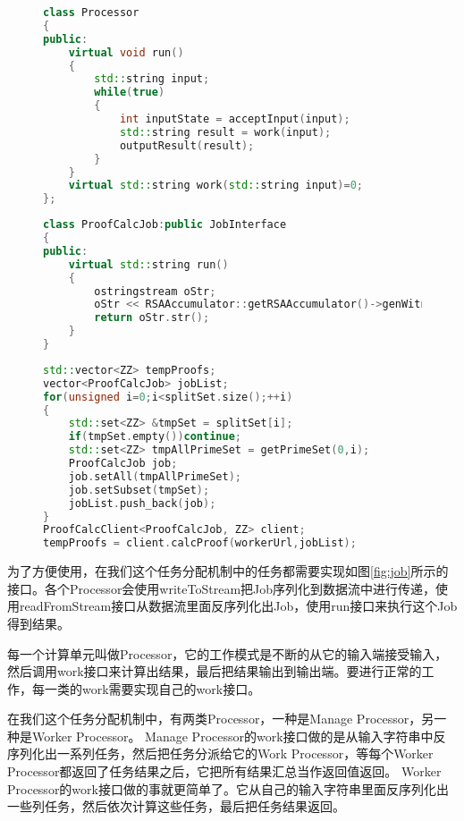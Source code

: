 \begin{figure}[htb]
\begin{lstlisting}[language=C++] 
class Processor
{
public:
    virtual void run()
    {
        std::string input;
        while(true)
        {
            int inputState = acceptInput(input);
            std::string result = work(input);
            outputResult(result);
        }
    }
    virtual std::string work(std::string input)=0;
};
\end{lstlisting}
\end{figure}
\begin{figure}[htb]
\begin{lstlisting}[language=C++] 
class ProofCalcJob:public JobInterface
{
public:
    virtual std::string run()
    {
        ostringstream oStr;
        oStr << RSAAccumulator::getRSAAccumulator()->genWitness(allSet, subset);
        return oStr.str();
    }
}
\end{lstlisting}
\end{figure}

\begin{figure}[htb]
\begin{lstlisting}[language=C++] 
std::vector<ZZ> tempProofs;
vector<ProofCalcJob> jobList;
for(unsigned i=0;i<splitSet.size();++i)
{
    std::set<ZZ> &tmpSet = splitSet[i];
    if(tmpSet.empty())continue;
    std::set<ZZ> tmpAllPrimeSet = getPrimeSet(0,i);
    ProofCalcJob job;
    job.setAll(tmpAllPrimeSet);
    job.setSubset(tmpSet);
    jobList.push_back(job);
}
ProofCalcClient<ProofCalcJob, ZZ> client;
tempProofs = client.calcProof(workerUrl,jobList);
\end{lstlisting}
\end{figure}

为了方便使用，在我们这个任务分配机制中的任务都需要实现如图\ref{fig:job}所示的接口。各个Processor会使用writeToStream把Job序列化到数据流中进行传递，使用readFromStream接口从数据流里面反序列化出Job，使用run接口来执行这个Job得到结果。

每一个计算单元叫做Processor，它的工作模式是不断的从它的输入端接受输入，然后调用work接口来计算出结果，最后把结果输出到输出端。要进行正常的工作，每一类的work需要实现自己的work接口。

在我们这个任务分配机制中，有两类Processor，一种是Manage Processor，另一种是Worker Processor。
Manage Processor的work接口做的是从输入字符串中反序列化出一系列任务，然后把任务分派给它的Work Processor，等每个Worker Processor都返回了任务结果之后，它把所有结果汇总当作返回值返回。
Worker Processor的work接口做的事就更简单了。它从自己的输入字符串里面反序列化出一些列任务，然后依次计算这些任务，最后把任务结果返回。

